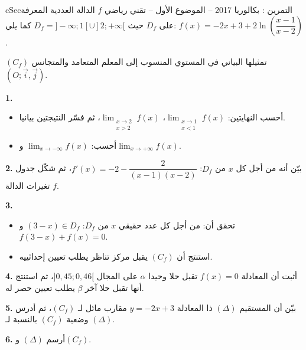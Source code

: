 \documentclass[12pt,a4paper]{article}
\newenvironment{BOX}[2]{\begin{otherlanguage}{english}\begin{arbox}{#1}{#2}}{\end{arbox}\end{otherlanguage}}
\newcounter{exo}
\newenvironment{tamrin}[1]{\stepcounter{exo}\begin{BOX}{cSec}{التمرين \theexo: #1}}{\end{BOX}}
\newenvironment{sq}{\begin{itemize}[leftmargin=2.4em,itemsep=3pt]}{\end{itemize}}
\newcommand{\qa}{\item[(أ)]}\newcommand{\qb}{\item[(ب)]}\newcommand{\qc}{\item[(جـ)]}\newcommand{\qd}{\item[(د)]}\newcommand{\qe}{\item[(هـ)]}
\newcommand{\QQ}[1]{\par\smallskip\textbf{#1.} }
\begin{document}
\begin{tamrin}{بكالوريا 2017 -- الموضوع الأول -- تقني رياضي}
$f$ الدالة العددية المعرفة على $D_f$ حيث $D_f=]-\infty;1[\cup]2;+\infty[$ كما يلي: $f(x)=-2x+3+2\ln\left(\dfrac{x-1}{x-2}\right)$.

$(C_f)$ تمثيلها البياني في المستوي المنسوب إلى المعلم المتعامد والمتجانس $(O;\vec{i},\vec{j})$.
\QQ{1}
\begin{sq}
\qa أحسب النهايتين: $\displaystyle\lim_{\substack{x\to1\\x<1}}f(x)$، $\displaystyle\lim_{\substack{x\to2\\x>2}}f(x)$، ثم فسّر النتيجتين بيانيا.
\qb أحسب: $\displaystyle\lim_{x\to-\infty}f(x)$ و$\displaystyle\lim_{x\to+\infty}f(x)$.
\end{sq}
\QQ{2} بيّن أنه من أجل كل $x$ من $D_f$: $f'(x)=-2-\dfrac{2}{(x-1)(x-2)}$، ثم شكّل جدول تغيرات الدالة $f$.
\QQ{3}
\begin{sq}
\qa تحقق أن: من أجل كل عدد حقيقي $x$ من $D_f$: $(3-x)\in D_f$ و$f(3-x)+f(x)=0$.
\qb استنتج أن $(C_f)$ يقبل مركز تناظر يطلب تعيين إحداثييه.
\end{sq}
\QQ{4} أثبت أن المعادلة $f(x)=0$ تقبل حلا وحيدا $\alpha$ على المجال $]0{,}45;0{,}46[$، ثم استنتج أنها تقبل حلا آخر $\beta$ يطلب تعيين حصر له.
\QQ{5} بيّن أن المستقيم $(\Delta)$ ذا المعادلة $y=-2x+3$ مقارب مائل لـ $(C_f)$، ثم أدرس وضعية $(C_f)$ بالنسبة لـ $(\Delta)$.
\QQ{6} أرسم $(\Delta)$ و$(C_f)$.
\end{tamrin}
\end{document}
